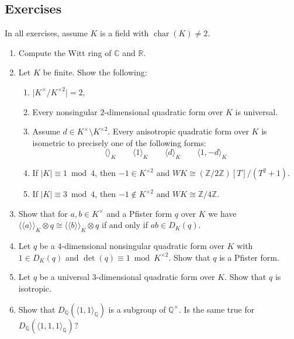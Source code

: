 \documentclass[12pt, leqno, british]{amsart}
\theoremstyle{definition}
\theoremstyle{plain}
\theoremstyle{remark}
\newcommand{\mbb}{\mathbb}
\newcommand{\cc}{\mathbb C}
\newcommand{\rr}{\mathbb R}
\newcommand{\qq}{\mbb Q}
\newcommand{\zz}{\mbb Z}
\DeclareMathOperator{\charac}{char}
\newcommand{\llangle}{\langle\!\langle}
\newcommand{\rrangle}{\rangle\!\rangle}
\begin{document}
\subsection{Exercises}
In all exercises, assume $K$ is a field with $\charac(K) \neq 2$.
\begin{enumerate}
\item Compute the Witt ring of $\cc$ and $\rr$.
\item Let $K$ be finite.
Show the following:
\begin{enumerate}
\item $\lvert K^\times / K^{\times 2} \rvert = 2$,
\item Every nonsingular $2$-dimensional quadratic form over $K$ is universal.
\item Assume $d \in K^\times \setminus K^{\times 2}$.
Every anisotropic quadratic form over $K$ is isometric to precisely one of the following forms:
\begin{displaymath}
\langle \rangle_K \qquad \langle 1 \rangle_K \qquad \langle d \rangle_K \qquad \langle 1, -d \rangle_K
\end{displaymath}
\item If $\lvert K \rvert \equiv 1 \bmod 4$, then $-1 \in K^{\times 2}$ and $WK \cong (\zz/2\zz)[T]/(T^2 + 1)$.
\item If $\lvert K \rvert \equiv 3 \bmod 4$, then $-1 \not\in K^{\times 2}$ and $WK \cong \zz/4\zz$.
\end{enumerate}
\item
Show that for $a, b \in K^\times$ and a Pfister form $q$ over $K$ we have $\llangle a \rrangle_K \otimes q \cong \llangle b \rrangle_K \otimes q$ if and only if $ab \in D_K(q)$.
\item Let $q$ be a $4$-dimensional nonsingular quadratic form over $K$ with $1 \in D_K(q)$ and $\det(q) \equiv 1 \bmod K^{\times 2}$.
Show that $q$ is a Pfister form.
\item Let $q$ be a universal $3$-dimensional quadratic form over $K$.
Show that $q$ is isotropic.
\item Show that $D_\qq(\langle 1, 1 \rangle_\qq)$ is a subgroup of $\qq^\times$.
Is the same true for $D_\qq(\langle 1, 1, 1 \rangle_\qq)$?
\end{enumerate}

\printindex
\printbibliography
\end{document}
